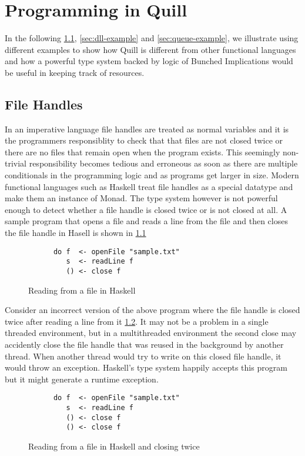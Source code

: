 \chapter{Programming in Quill}
In the following \cref{sec:file-handle-example}, \cref{sec:dll-example} and \cref{sec:queue-example},
we illustrate using different examples to show how Quill is different
from other functional languages and how a powerful type system backed by logic of Bunched Implications
would be useful in keeping track of resources.

\section{File Handles}\label{sec:file-handle-example}
In an imperative language file handles are treated as normal variables
and it is the programmers responsiblity to check that that files are not closed twice
or there are no files that remain open when the program exists. This seemingly non-trivial
responsibility becomes tedious and erroneous as soon as there are multiple conditionals in the programming
logic and as programs get larger in size. Modern functional languages such as Haskell treat file handles as
a special datatype and make them an instance of Monad. The type system however is not powerful enough
to detect whether a file handle is closed twice or is not closed at all. A sample program that opens a file and reads
a line from the file and then closes the file handle in Hasell is shown in \cref{fig:file-read-close}
\begin{figure}[h]
  \begin{framed}
    \begin{verbatim}
      do f  <- openFile "sample.txt"
         s  <- readLine f
         () <- close f
    \end{verbatim}
  \end{framed}
  \caption{Reading from a file in Haskell}
  \label{fig:file-read-close}
\end{figure}

Consider an incorrect version of the above program where the file handle is closed twice after reading a line from it \cref{fig:file-read-close-2times}.
It may not be a problem in a single threaded environment, but in a multithreaded environment
the second close may accidently close the file handle that was reused in the background by another thread. When
another thread would try to write on this closed file handle, it would throw an exception.
Haskell's type system happily accepts this program but it might generate a runtime exception.
\begin{figure}[h]
  \begin{framed}
    \begin{verbatim}
      do f  <- openFile "sample.txt"
         s  <- readLine f
         () <- close f
         () <- close f
    \end{verbatim}
  \end{framed}
  \caption{Reading from a file in Haskell and closing twice}
  \label{fig:file-read-close-2times}
\end{figure}

